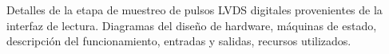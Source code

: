 Detalles de la etapa de muestreo de pulsos LVDS digitales provenientes de la interfaz de lectura. Diagramas del diseño de hardware, máquinas de estado, descripción del funcionamiento, entradas y salidas, recursos utilizados.